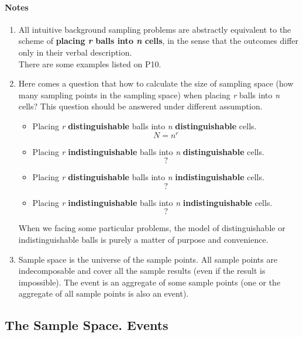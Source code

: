 \documentclass{article}
\begin{document}
	\paragraph{Notes} 
	\begin{enumerate} 
	\item All intuitive background sampling problems are abstractly equivalent to the scheme of \textbf{placing \textit{r} balls into \textit{n} cells}, in the sense that the outcomes differ only in their verbal description. \\There are some examples listed on P10.
	\item Here comes a question that how to calculate the size of sampling space (how many sampling points in the sampling space) when placing \textit{r} balls into \textit{n} cells? This question should be answered under different assumption.
		\begin{itemize}
		\item Placing \textit{r} \textbf{distinguishable} balls into \textit{n} \textbf{distinguishable} cells. \\ $$N=n^r$$
		\item Placing \textit{r} \textbf{indistinguishable} balls into \textit{n} \textbf{distinguishable} cells. \\ $$?$$
		\item Placing \textit{r} \textbf{distinguishable} balls into \textit{n} \textbf{indistinguishable} cells. \\ $$?$$
		\item Placing \textit{r} \textbf{indistinguishable} balls into \textit{n} \textbf{indistinguishable} cells. \\ $$?$$
		\end{itemize}
	When we facing some particular problems, the model of distinguishable or indistinguishable balls is purely a matter of purpose and convenience.
	\item Sample space is the universe of the sample points. All sample points are indecomposable and cover all the sample results (even if the result is impossible). The event is an aggregate of some sample points (one or the aggregate of all sample points is also an event). 
	\end{enumerate}
	\subsection{The Sample Space. Events}
\end{document}
